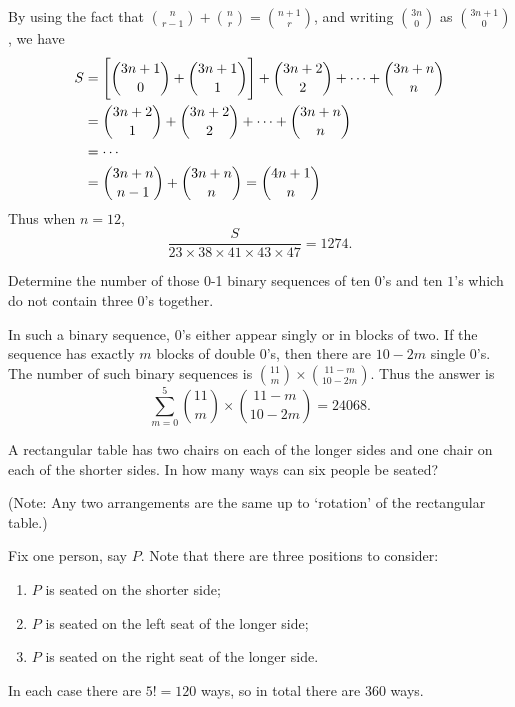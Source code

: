 \begin{solution}
By using the fact that $\binom{n}{r-1}+\binom{n}{r}=\binom{n+1}{r}$, and writing $\binom{3n}{0}$ as $\binom{3n+1}{0}$, we have
\begin{align*}
S &= \left[\binom{3n+1}{0}+\binom{3n+1}{1}\right]+\binom{3n+2}{2}+\cdots+\binom{3n+n}{n} \\
&= \binom{3n+2}{1}+\binom{3n+2}{2}+\cdots+\binom{3n+n}{n} \\
&= \cdots \\
&= \binom{3n+n}{n-1}+\binom{3n+n}{n}=\binom{4n+1}{n}
\end{align*}
Thus when $n=12$,
\[ \frac{S}{23\times38\times41\times43\times47}=1274. \]
\end{solution}

\begin{prbm}
Determine the number of those 0-1 binary sequences of ten $0$'s and ten $1$'s which do not contain three $0$'s together.
\end{prbm}

\begin{solution}
In such a binary sequence, $0$'s either appear singly or in blocks of two. If the sequence has exactly $m$ blocks of double $0$'s, then there are $10-2m$ single $0$'s. The number of such binary sequences is $\binom{11}{m}\times\binom{11-m}{10-2m}$. Thus the answer is
\[ \sum_{m=0}^5\binom{11}{m}\times\binom{11-m}{10-2m}=24068. \]
\end{solution}

\begin{prbm}
A rectangular table has two chairs on each of the longer sides and one chair on each of the shorter sides. In how many ways can six people be seated?

(Note: Any two arrangements are the same up to `rotation' of the rectangular table.)
\end{prbm}

\begin{solution}
Fix one person, say $P$. Note that there are three positions to consider:
\begin{enumerate}
\item $P$ is seated on the shorter side;
\item $P$ is seated on the left seat of the longer side;
\item $P$ is seated on the right seat of the longer side.
\end{enumerate}
In each case there are $5!=120$ ways, so in total there are $\boxed{360}$ ways.
\end{solution}
\pagebreak

